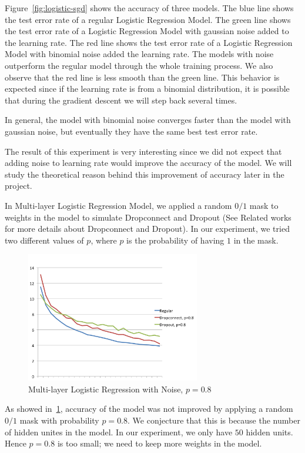 Figure~\ref{fig:logistic-sgd} shows the accuracy of three models.
The blue line shows the test error rate of a regular Logistic Regression
Model.  The green line shows the test error rate of a Logistic Regression
Model with gaussian noise added to the learning rate.  The red line shows
the test error rate of a Logistic Regression Model with binomial noise
added the learning rate.  The models with noise outperform the regular
model through the whole training process.  We also observe that the red
line is less smooth than the green line.  This behavior is expected since
if the learning rate is from a binomial distribution, it is possible that
during the gradient descent we will step back several times.

In general, the model with binomial noise converges faster than the model
with gaussian noise, but eventually they have the same best test error
rate.

The result of this experiment is very interesting since we did not
expect that adding noise to learning rate would improve the accuracy
of the model. We will study the theoretical reason behind this improvement
of accuracy later in the project.

In Multi-layer Logistic Regression Model, we applied a random $0/1$ mask to
weights in the model to simulate Dropconnect and Dropout
(See Related works for more details about Dropconnect and Dropout).
In our experiment, we tried two different values of $p$, where $p$ is
the probability of having $1$ in the mask.

\begin{figure}[h]
\centering
\includegraphics[width=215pt]{figs/mlp_psmall.png}
\caption{Multi-layer Logistic Regression with Noise, $p=0.8$}
\label{fig:mlp-noise-psmall}
\end{figure}

As showed in~\ref{fig:mlp-noise-psmall}, accuracy of the model was not
improved by applying a random $0/1$ mask with probability $p=0.8$.
We conjecture that this is because the number of hidden unites in the
model. In our experiment, we only have $50$ hidden units. Hence $p=0.8$ is
too small; we need to keep more weights in the model.

